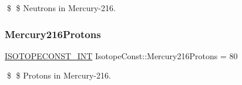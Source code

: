 \$ \$ Neutrons in Mercury-\/216. \mbox{\label{group___isotope_const-_mercury-_hg216_gaa2897f9066bbe835388ce1964ce550ed}} 
\subsubsection{\texorpdfstring{Mercury216\+Protons}{Mercury216Protons}}
{\footnotesize\ttfamily \mbox{\hyperlink{group___isotope_const-_macros_ga5f18360b3e99483a35c32d789e62621c}{I\+S\+O\+T\+O\+P\+E\+C\+O\+N\+S\+T\+\_\+\+I\+NT}} Isotope\+Const\+::\+Mercury216\+Protons = 80}

\$ \$ Protons in Mercury-\/216. 